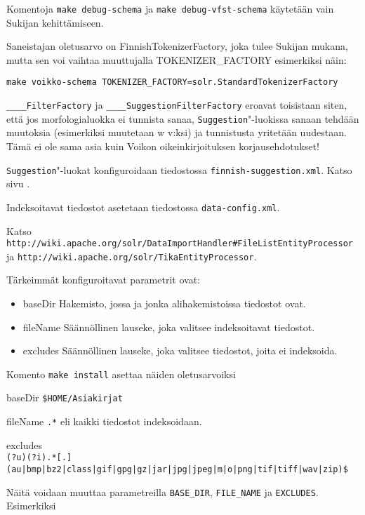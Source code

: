 \documentclass[12pt,a4paper]{scrartcl}
\begin{document}
Komentoja \verb=make debug-schema= ja \verb=make debug-vfst-schema=
käytetään vain Sukijan kehittämiseen.

Saneistajan oletusarvo on FinnishTokenizerFactory, joka tulee Sukijan
mukana, mutta sen voi vaihtaa muuttujalla TOKENIZER\_FACTORY
esimerkiksi näin:

\verb|make voikko-schema TOKENIZER_FACTORY=solr.StandardTokenizerFactory|

\verb=____FilterFactory= ja \verb=____SuggestionFilterFactory= eroavat
toisistaan siten, että jos morfologialuokka ei tunnista sanaa,
\verb=Suggestion="-luokissa sanaan tehdään muutoksia (esimerkiksi
muutetaan w v:ksi) ja tunnistusta yritetään uudestaan. Tämä ei ole
sama asia kuin Voikon oikeinkirjoituksen korjausehdotukset!

\verb=Suggestion="-luokat konfiguroidaan tiedostossa
\verb|finnish-suggestion.xml|. Katso sivu .

\bigskip
Indeksoitavat tiedostot asetetaan tiedostossa \verb|data-config.xml|.

Katso \\
\verb|http://wiki.apache.org/solr/DataImportHandler#FileListEntityProcessor| \\
ja
\verb|http://wiki.apache.org/solr/TikaEntityProcessor|.

Tärkeimmät konfiguroitavat parametrit ovat:

\begin{itemize}
\item baseDir
Hakemisto, jossa ja jonka alihakemistoissa tiedostot ovat.

\item fileName
Säännöllinen lauseke, joka valitsee indeksoitavat tiedostot.

\item excludes
Säännöllinen lauseke, joka valitsee tiedostot, joita ei indeksoida.
\end{itemize}

Komento \verb|make install| asettaa näiden oletusarvoiksi

baseDir \verb|$HOME/Asiakirjat|

fileName \verb|.*| eli kaikki tiedostot indeksoidaan.

excludes \\
{\footnotesize \verb+(?u)(?i).*[.](au|bmp|bz2|class|gif|gpg|gz|jar|jpg|jpeg|m|o|png|tif|tiff|wav|zip)$+}


Näitä voidaan muuttaa parametreilla \verb|BASE_DIR|,
\verb|FILE_NAME| ja
\verb|EXCLUDES|. Esimerkiksi
\end{document}
